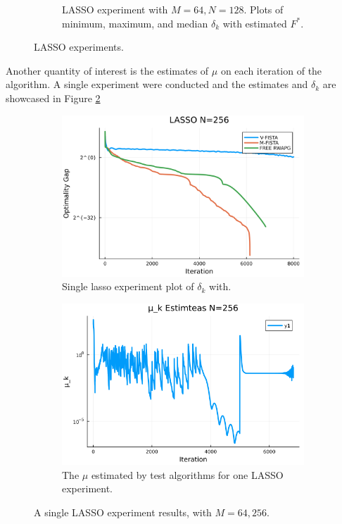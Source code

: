 \documentclass[12pt]{article}
\begin{document}
\begin{figure}[H]
\begin{subfigure}[b]{0.47\textwidth}
                \caption{LASSO experiment with $M = 64, N = 128$. Plots of minimum, maximum, and median $\delta_k$ with estimated $F^*$. }
            \end{subfigure}
            \caption{LASSO experiments. }
            \label{fig:batched-lasso}
        \end{figure}
        \par
        Another quantity of interest is the estimates of $\mu$ on each iteration of the algorithm. 
        A single experiment were conducted and the estimates and $\delta_k$ are showcased in Figure \ref{fig:single-lass-mu-estimates}
        \begin{figure}[H]
            \begin{subfigure}[b]{0.47\textwidth}
                \includegraphics[width=\textwidth]{assets/lasso_loss_256.png}
                \caption{Single lasso experiment plot of $\delta_k$ with.  }
            \end{subfigure}
            \hfill
            \begin{subfigure}[b]{0.47\textwidth}
                \includegraphics[width=\textwidth]{assets/lasso_sc_estimates_256.png}
                \caption{The $\mu$ estimated by test algorithms for one LASSO experiment. }
            \end{subfigure}
            \caption{A single LASSO experiment results, with $M = 64, 256$. }
            \label{fig:single-lass-mu-estimates}
        \end{figure}
\end{document}
